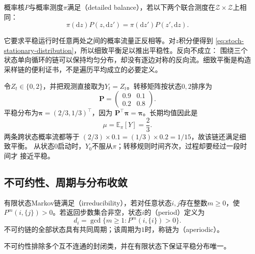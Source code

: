 \begin{definition}[细致平衡]
  \label{def:stoch-detailed-balance}
概率核\(P\)与概率测度\(\pi\)满足（detailed balance），若以下两个联合测度在\(\mathcal Z\times\mathcal Z\)上相同：
\begin{equation}
  \pi(\mathrm{d}z)P(z,\mathrm{d}z')
  =\pi(\mathrm{d}z')P(z',\mathrm{d}z).
  \label{eq:stoch-detailed-balance}
\end{equation}
\end{definition}
它要求平稳运行时任意两处之间的概率流量正反相等。对$z$积分便得到
\eqref{eq:stoch-stationary-distribution}，所以细致平衡足以推出平稳性。反向不成立：
围绕三个状态单向循环的链可以保持均匀分布，却没有逐边对称的反向流。细致平衡是构造
采样链的便利证书，不是遍历平均成立的必要定义。

\begin{example}[相关的两状态观测]
  \label{ex:stoch-two-state-chain}
  令$Z_t\in\{0,2\}$，并把观测直接取为$Y_t=Z_t$。转移矩阵按状态$0,2$排序为
  \[
    \bm{P}
    =
    \begin{pmatrix}
      0.9 & 0.1\\
      0.2 & 0.8
    \end{pmatrix}.
  \]
  平稳分布为$\bm{\pi}=(2/3,1/3)^\top$，因为
  $\bm{P}^{\top}\bm{\pi}=\bm{\pi}$。长期均值因此是
  \[
    \mu=\mathbb{E}_{\pi}[Y]=\frac23.
  \]
  两条跨状态概率流都等于
  $(2/3)\times0.1=(1/3)\times0.2=1/15$，故该链还满足细致平衡。
  从状态$0$启动时，$Y_0$不服从$\pi$；转移规则时间齐次，过程却要经过一段时间才
  接近平稳。
\end{example}

\subsection{不可约性、周期与分布收敛}

\begin{definition}[有限链的不可约性与周期]
  \label{def:stoch-finite-irreducibility-period}
  有限状态Markov链满足（irreducibility），若对任意状态\(i,j\)存在整数\(m\geq0\)，使\(P^m(i,\{j\})>0\)。若返回步数集合非空，状态\(i\)的（period）定义为
  \[ d_i=\gcd\{m\geq1:P^m(i,\{i\})>0\}. \]
  不可约链的全部状态具有共同周期；该周期为\(1\)时，称链为（aperiodic）。
\end{definition}
不可约性排除多个互不连通的封闭类，并在有限状态下保证平稳分布唯一。

